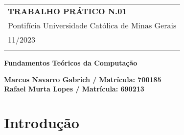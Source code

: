 \documentclass[a4paper,12pt]{article} %
\begin{document}



\thispagestyle{empty} %

\begin{tabular}{p{15.5cm}} %
{\large \bf TRABALHO PRÁTICO N.01} \\
Pontifícia Universidade Católica de Minas Gerais \\ 11/2023 \\
\hline %
\\
\end{tabular} %

\vspace*{0.3cm} %

\begin{center} %
	{\Large \bf Fundamentos Teóricos da Computação} %
	\vspace{2mm}
	
	{\bf Marcus Navarro Gabrich / Matrícula: 700185  \\ Rafael Murta Lopes / Matrícula: 690213} %

\end{center}  

\vspace{0.4cm}



\section{Introdução}
\end{document}
